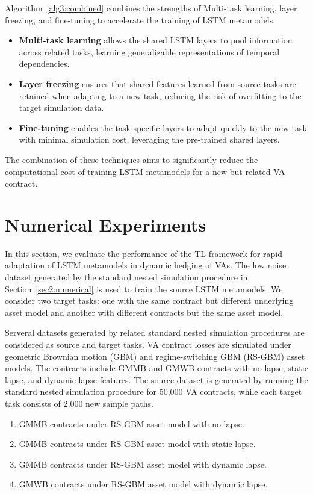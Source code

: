 Algorithm~\ref{alg3:combined} combines the strengths of Multi-task learning, layer freezing, and fine-tuning to accelerate the training of LSTM metamodels. 

\begin{itemize}
    \item \textbf{Multi-task learning} allows the shared LSTM layers to pool information across related tasks, learning generalizable representations of temporal dependencies.
    \item \textbf{Layer freezing} ensures that shared features learned from source tasks are retained when adapting to a new task, reducing the risk of overfitting to the target simulation data.
    \item \textbf{Fine-tuning} enables the task-specific layers to adapt quickly to the new task with minimal simulation cost, leveraging the pre-trained shared layers.
\end{itemize}
    
The combination of these techniques aims to significantly reduce the computational cost of training LSTM metamodels for a new but related VA contract.

\section{Numerical Experiments} \label{sec3:experiments}

In this section, we evaluate the performance of the TL framework for rapid adaptation of LSTM metamodels in dynamic hedging of VAs.
The low noise dataset generated by the standard nested simulation procedure in Section~\ref{sec2:numerical} is used to train the source LSTM metamodels.
We consider two target tasks: one with the same contract but different underlying asset model and another with different contracts but the same asset model.

Serveral datasets generated by related standard nested simulation procedures are considered as source and target tasks.
VA contract losses are simulated under geometric Brownian motion (GBM) and regime-switching GBM (RS-GBM) asset models.
The contracts include GMMB and GMWB contracts with no lapse, static lapse, and dynamic lapse features.
The source dataset is generated by running the standard nested simulation procedure for 50,000 VA contracts, while each target task consists of 2,000 new sample paths.

\begin{enumerate}
    \item   GMMB contracts under RS-GBM asset model with no lapse.
    \item   GMMB contracts under RS-GBM asset model with static lapse.
    \item   GMMB contracts under RS-GBM asset model with dynamic lapse.
    \item   GMWB contracts under RS-GBM asset model with dynamic lapse.
\end{enumerate}

